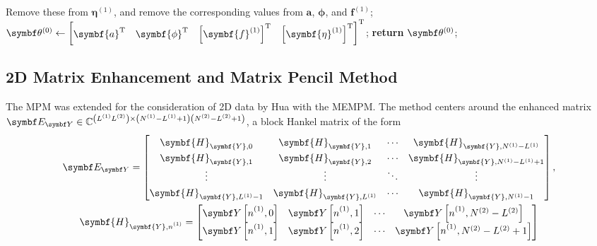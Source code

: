 {\begin{algorithm}
\begin{algorithmic}[1]
                \State Remove these from $\symbf{\eta}^{(1)}$, and remove the
                corresponding values from
                $\symbf{a}$, $\symbf{\phi}$, and $\symbf{f}^{(1)}$;
            \EndIf
            \State $\bthzero \gets
                \begin{bmatrix}
                    \symbf{a}\T &
                    \symbf{\phi}\T &
                    \left[\symbf{f}^{(1)}\right]\T &
                    \left[\symbf{\eta}^{(1)}\right]\T
                \end{bmatrix}\T
            $;
            \State \textbf{return} $\bthzero$;
        \EndProcedure
    \end{algorithmic}
\end{algorithm}

\subsection{2D Matrix Enhancement and Matrix Pencil Method}
The \ac{MPM} was extended for the consideration of \ac{2D} data by Hua with the
\ac{MEMPM}\cite{Hua1992}. The method centers around the enhanced matrix $\EY
\in \mathbb{C}^{\left(\Lone \Ltwo\right) \times \left(\None - \Lone +
1\right)\left(\Ntwo - \Ltwo + 1\right)}$, a block Hankel matrix of the form
\begin{subequations}
    \begin{gather}
        \EY =
        \begin{bmatrix}
            \symbf{H}_{\symbf{Y},0} & \symbf{H}_{\symbf{Y},1} & \cdots & \symbf{H}_{\symbf{Y},\None - \Lone} \\
            \symbf{H}_{\symbf{Y},1} & \symbf{H}_{\symbf{Y},2} & \cdots & \symbf{H}_{\symbf{Y},\None - \Lone + 1} \\
            \vdots & \vdots & \ddots & \vdots \\
            \symbf{H}_{\symbf{Y},\Lone - 1} & \symbf{H}_{\symbf{Y},\Lone} & \cdots & \symbf{H}_{\symbf{Y},\None - 1}
        \end{bmatrix}, \\
        \def\arraystretch{1.3}
        \symbf{H}_{\symbf{Y},\none} =
        \begin{bmatrix}
            \bY\left[ \none, 0 \right] & \bY\left[ \none, 1 \right] & \cdots & \bY\left[ \none, \Ntwo - \Ltwo \right] \\
            \bY\left[ \none, 1 \right] & \bY\left[ \none, 2 \right] & \cdots & \bY\left[ \none, \Ntwo - \Ltwo + 1 \right] \\

\end{bmatrix}
\end{gather}
\end{subequations}}
